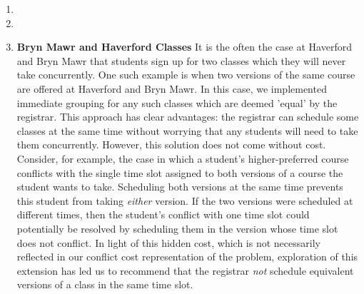 \documentclass[11pt, oneside]{article}   	%
\begin{document}
\begin{enumerate}
\item{}

\item{}

\item{\textbf{Bryn Mawr and Haverford Classes}}
It is the often the case at Haverford and Bryn Mawr that students sign up for two classes which they will never take concurrently. One such example is when two versions of the same course are offered at Haverford and Bryn Mawr. In this case, we implemented immediate grouping for any such classes which are deemed 'equal' by the registrar. This approach has clear advantages: the registrar can schedule some classes at the same time without worrying that any students will need to take them concurrently. However, this solution does not come without cost. Consider, for example, the case in which a student's higher-preferred course conflicts with the single time slot assigned to both versions of a course the student wants to take. Scheduling both versions at the same time prevents this student from taking \textit{either} version. If the two versions were scheduled at different times, then the student's conflict with one time slot could potentially be resolved by scheduling them in the version whose time slot does not conflict. In light of this hidden cost, which is not necessarily reflected in our conflict cost representation of the problem, exploration of this extension has led us to recommend that the registrar \textit{not} schedule equivalent versions of a class in the same time slot.

\end{enumerate}
\end{document}
